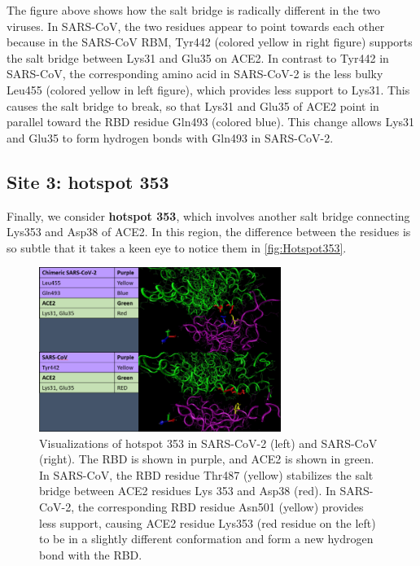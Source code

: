 {{The figure above shows how the salt bridge is radically different in the two viruses. In SARS-CoV, the two residues appear to point towards each other because in the SARS-CoV RBM, Tyr442 (colored yellow in right figure) supports the salt bridge between Lys31 and Glu35 on ACE2. In contrast to Tyr442 in SARS-CoV, the corresponding amino acid in SARS-CoV-2 is the less bulky Leu455 (colored yellow in left figure), which provides less support to Lys31. This causes the salt bridge to break, so that Lys31 and Glu35 of ACE2 point in parallel toward the RBD residue Gln493 (colored blue). This change allows Lys31 and Glu35 to form hydrogen bonds with Gln493 in SARS-CoV-2.

\FloatBarrier
{}
\subsection{Site 3: hotspot 353}

Finally, we consider \textbf{hotspot 353}, which involves another salt bridge connecting Lys353 and Asp38 of ACE2. In this region, the difference between the residues is so subtle that it takes a keen eye to notice them in \autoref{fig:Hotspot353}.

\begin{figure}[h]
	\centering
	\mySfFamily
	\includegraphics[width = 0.7\textwidth]{../images/Hotspot31.png}
	\caption{Visualizations of hotspot 353 in SARS-CoV-2 (left) and SARS-CoV (right). The RBD is shown in purple, and ACE2 is shown in green. In SARS-CoV, the RBD residue Thr487 (yellow) stabilizes the salt bridge between ACE2 residues Lys 353 and Asp38 (red). In SARS-CoV-2, the corresponding RBD residue Asn501 (yellow) provides less support, causing ACE2 residue Lys353 (red residue on the left) to be in a slightly different conformation and form a new hydrogen bond with the RBD.}
	\label{fig:Hotspot31}
\end{figure}

}}

